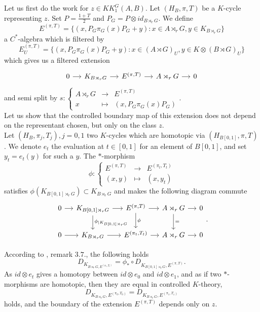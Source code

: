 Let us first do the work for $z\in KK_1^G(A,B)$. Let $(H_B,\pi,T)$ be a $K$-cycle representing $z$. Set $P=\frac{1+T}{2}$ and $P_G=P\otimes id_{B\rtimes_r G}$. We define
\[E^{(\pi,T)}=\{(x,P_G\pi_G(x)P_G + y) : x\in A\rtimes_r G, y\in K_{B\rtimes_r G}\}\]
a $C^*$-algebra which is filtered by
\[E_U^{(\pi,T)}=\{(x,P_G\pi_G(x)P_G + y) : x\in (A\rtimes G)_U, y\in K\otimes (B\rtimes G)_U\}\]
which gives us a filtered extension
\[\begin{tikzcd}[column sep = small]
0\arrow{r} & K_{B\rtimes_rG}\arrow{r} & E^{(\pi,T)} \arrow{r} & A\rtimes_r G \arrow{r}& 0
\end{tikzcd}\]
and semi split by  $s :\left\{\begin{array}{lll}A\rtimes_r G & \rightarrow & E^{(\pi,T)} \\ x & \mapsto & (x, P_G \pi_G(x)P_G)\end{array}\right.$.\\

Let us show that the controlled boundary map of this extension does not depend on the representant chosen, but only on the class $z$.\\
Let $(H_B, \pi_j,T_j), j=0,1$ two $K$-cycles which are homotopic via $(H_{B[0,1]},\pi,T)$. We denote $e_t$ the evaluation at $t\in[0,1]$ for an element of $B[0,1]$, and set $y_t=e_t(y)$ for such a $y$. The $*$-morphism
\[\phi : \left\{\begin{array}{lll}E^{(\pi,T)} & \rightarrow & E^{(\pi_t,T_t)} \\ (x,y) & \mapsto & (x, y_t)\end{array}\right.\]
satisfies $\phi(K_{B[0,1] \rtimes_r G})\subset K_{B \rtimes_r G}$ and makes the following diagram commute
\[\begin{tikzcd}[column sep = small]
0\arrow{r} & K_{B[0,1] \rtimes_r G}\arrow{r}\arrow{d}{\phi_{|K_{B[0,1] \rtimes_r G}}} & E^{(\pi,T)} \arrow{r}\arrow{d}{\phi} & A\rtimes_r G \arrow{r}\arrow{d}{=}& 0 \\
0\arrow{r} & K_{B \rtimes_r G}\arrow{r} &  E^{(\pi_t,T_t)} \arrow{r} & A\rtimes_r G \arrow{r} & 0
\end{tikzcd}.\]

According to \cite{OY2}, remark $3.7.$, the following holds
\[D_{K_{B\rtimes_rG,E^{(\pi_t,T_t)}}} = \phi_* \circ D_{K_{B[0,1]\rtimes_rG},E^{(\pi,T)}}.\]
As $id \otimes e_t$ gives a homotopy between $id\otimes e_0$ and $id\otimes e_1$, and as if two $*$-morphisms are homotopic, then they are equal in controlled $K$-theory, 
\[D_{K_{B\rtimes_r G}, E^{(\pi_0,T_0)}}=D_{K_{B\rtimes_r G}, E^{(\pi_1,T_1)}}\]
holds, and the boundary of the extension $E^{(\pi,T)}$ depends only on $z$.\\

